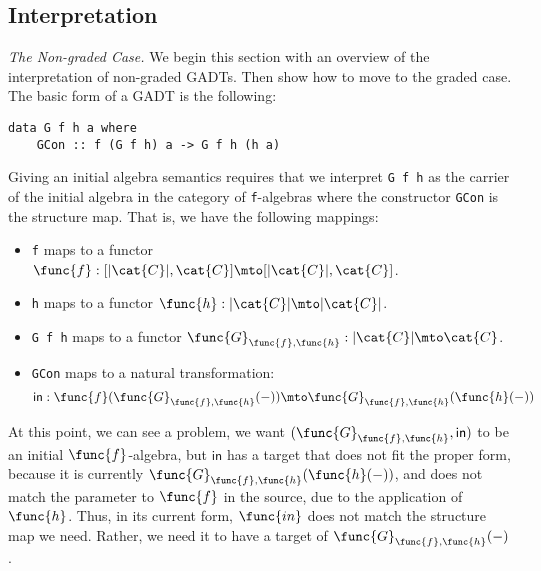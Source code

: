 \subsection{Interpretation}
\label{subsec:interpretation}
\emph{The Non-graded Case.} We begin this section with an overview of
the interpretation of non-graded GADTs.  Then show how to move to the
graded case. The basic form of a GADT is the following:
\begin{verbatim}
data G f h a where
    GCon :: f (G f h) a -> G f h (h a)
\end{verbatim}
Giving an initial algebra semantics requires that we interpret 
\verb!G f h! as the carrier of the initial algebra in the category 
of \verb!f!-algebras where the constructor \verb!GCon! is the 
structure map.  That is, we have the following mappings:
\begin{itemize}
    \item \verb!f! maps to a functor $\func{f} : [|\cat{C}|,\cat{C}]
    \mto [|\cat{C}|, \cat{C}]$.

    \item \verb!h! maps to a functor $\func{h} : |\cat{C}| \mto
    |\cat{C}|$. 

    \item \verb!G f h! maps to a functor 
$\func{G}_{\func{f},\func{h}} : |\cat{C}| \mto \cat{C}$.

    \item \verb!GCon! maps to a natural transformation:
          \[
            \mathsf{in} : \func{f}(\func{G}_{\func{f},\func{h}}(-)) \mto \func{G}_{\func{f},\func{h}}(\func{h}(-))
          \]
\end{itemize}
At this point, we can see a problem, we want $(\func{G}_{\func{f},\func{h}},
\mathsf{in})$ to be an initial $\func{f}$-algebra, but
$\mathsf{in}$ has a target that does not fit the proper form, because
it is currently $\func{G}_{\func{f},\func{h}}(\func{h}(-))$, and
does not match the parameter to $\func{f}$ in the source, due to
the application of $\func{h}$.  Thus, in its current form, $\func{in}$
does not match the structure map we need.  Rather, we need it to have
a target of $\func{G}_{\func{f},\func{h}}(-)$.

